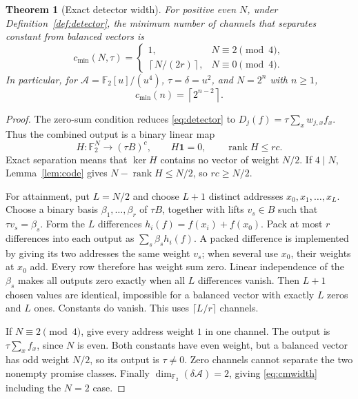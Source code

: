 \documentclass[11pt,a4paper]{article}
\newtheorem{theorem}{Theorem}[section]
\theoremstyle{definition}\newtheorem{definition}[theorem]{Definition}
\theoremstyle{remark}\newtheorem{remark}[theorem]{Remark}
\newcommand{\F}{\mathbb F}
\newcommand{\A}{\mathcal A}
\newcommand{\rank}{\operatorname{rank}}
\numberwithin{equation}{section}
\begin{document}
\begin{theorem}[Exact detector width]\label{thm:detectors}
For positive even $N$, under Definition~\ref{def:detector}, the minimum number of channels that separates constant from balanced vectors is
\begin{equation}\label{eq:width}
 c_{\min}(N,\tau)=
 \begin{cases}
 1,&N\equiv2\pmod4,\\[2pt]
 \left\lceil N/(2r)\right\rceil,&N\equiv0\pmod4.
 \end{cases}
\end{equation}
In particular, for $\A=\F_2[u]/(u^4)$, $\tau=\delta=u^2$, and $N=2^n$ with $n\ge1$,
\begin{equation}\label{eq:cmwidth}
 c_{\min}(n)=\left\lceil2^{n-2}\right\rceil.
\end{equation}
\end{theorem}
\begin{proof}
The zero-sum condition reduces \eqref{eq:detector} to
$D_j(f)=\tau\sum_xw_{j,x}f_x$. Thus the combined output is a binary linear map
\[
 H:\F_2^N\longrightarrow(\tau B)^c,\qquad H\mathbf1=0,
 \qquad \rank H\le rc.
\]
Exact separation means that $\ker H$ contains no vector of weight $N/2$. If $4\mid N$, Lemma~\ref{lem:code} gives $N-\rank H\le N/2$, so $rc\ge N/2$.

For attainment, put $L=N/2$ and choose $L+1$ distinct addresses $x_0,x_1,\ldots,x_L$. Choose a binary basis $\beta_1,\ldots,\beta_r$ of $\tau B$, together with lifts $v_s\in B$ such that $\tau v_s=\beta_s$. Form the $L$ differences
$h_i(f)=f(x_i)+f(x_0)$. Pack at most $r$ differences into each output as $\sum_s\beta_sh_i(f)$. A packed difference is implemented by giving its two addresses the same weight $v_s$; when several use $x_0$, their weights at $x_0$ add. Every row therefore has weight sum zero. Linear independence of the $\beta_s$ makes all outputs zero exactly when all $L$ differences vanish. Then $L+1$ chosen values are identical, impossible for a balanced vector with exactly $L$ zeros and $L$ ones. Constants do vanish. This uses $\lceil L/r\rceil$ channels.

If $N\equiv2\pmod4$, give every address weight $1$ in one channel. The output is $\tau\sum_xf_x$, since $N$ is even. Both constants have even weight, but a balanced vector has odd weight $N/2$, so its output is $\tau\ne0$. Zero channels cannot separate the two nonempty promise classes. Finally $\dim_{\F_2}(\delta\A)=2$, giving \eqref{eq:cmwidth} including the $N=2$ case.
\end{proof}
\end{document}

